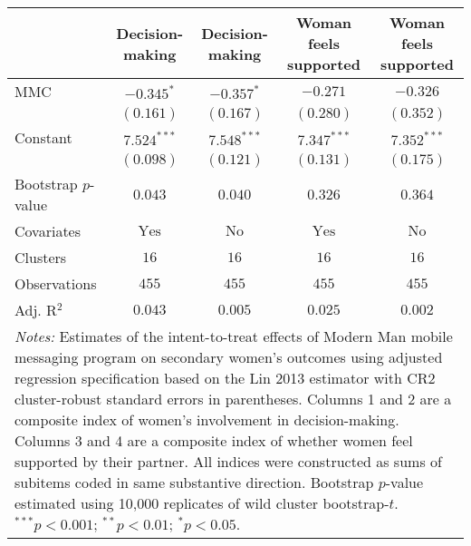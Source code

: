 
\begin{tabular}{l c c c c}
\toprule
 & Decision-making & Decision-making & Woman feels supported & Woman feels supported \\
\midrule
MMC                 & $-0.345^{*}$   & $-0.357^{*}$  & $-0.271$       & $-0.326$      \\
                    & $(0.161)$      & $(0.167)$     & $(0.280)$      & $(0.352)$     \\
Constant            & $7.524^{***}$  & $7.548^{***}$ & $7.347^{***}$  & $7.352^{***}$ \\
                    & $(0.098)$      & $(0.121)$     & $(0.131)$      & $(0.175)$     \\
\midrule
Bootstrap $p$-value & $0.043$        & $0.040$       & $0.326$        & $0.364$       \\
Covariates          & $\textrm{Yes}$ & $\textrm{No}$ & $\textrm{Yes}$ & $\textrm{No}$ \\
Clusters            & $16$           & $16$          & $16$           & $16$          \\
Observations        & $455$          & $455$         & $455$          & $455$         \\
Adj. R$^2$          & $0.043$        & $0.005$       & $0.025$        & $0.002$       \\
\bottomrule
\multicolumn{5}{l}{\scriptsize{\parbox{\linewidth}{\vspace{2pt}
       \textit{Notes:} Estimates of the intent-to-treat effects of Modern Man mobile
       messaging program on secondary women's outcomes using adjusted regression
       specification based on the Lin 2013 estimator with CR2 cluster-robust
       standard errors in parentheses. Columns 1 and 2 are a composite index of
       women's involvement in decision-making. Columns 3 and 4 are a composite index of 
       whether women feel supported by their partner. All indices were constructed as sums of 
       subitems coded in same substantive direction. Bootstrap $p$-value estimated using 10,000 replicates of wild cluster bootstrap-$t$. \\ $^{***}p<0.001$; $^{**}p<0.01$; $^{*}p<0.05$.}}}
\end{tabular}
